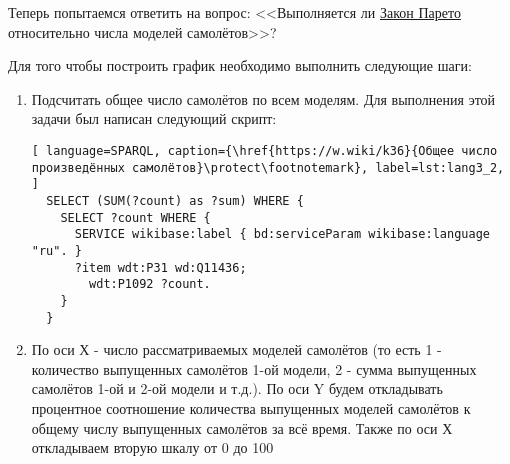 Теперь попытаемся ответить на вопрос: <<Выполняется ли \href{https://clck.ru/JvaaU}{Закон Парето} относительно числа моделей самолётов>>?

Для того чтобы построить график необходимо выполнить следующие шаги:

\label{aircraft_question_2}

\begin{enumerate} 
  \item Подсчитать общее число самолётов по всем моделям. Для выполнения этой задачи был написан следующий скрипт:
  
  \begin{lstlisting}[ language=SPARQL, caption={\href{https://w.wiki/k36}{Общее число произведённых самолётов}\protect\footnotemark}, label=lst:lang3_2, ]
  SELECT (SUM(?count) as ?sum) WHERE {
    SELECT ?count WHERE {
      SERVICE wikibase:label { bd:serviceParam wikibase:language "ru". }
      ?item wdt:P31 wd:Q11436;
        wdt:P1092 ?count.
    }
  }
  \end{lstlisting}
  
  
  \item По оси Х - число рассматриваемых моделей самолётов (то есть 1 - количество выпущенных самолётов 1-ой модели, 2 - сумма выпущенных самолётов 1-ой и 2-ой модели и т.д.). По оси Y будем откладывать процентное соотношение количества выпущенных моделей самолётов к общему числу выпущенных самолётов за всё время. Также по оси Х откладываем вторую шкалу от 0 до 100%
\end{enumerate}

